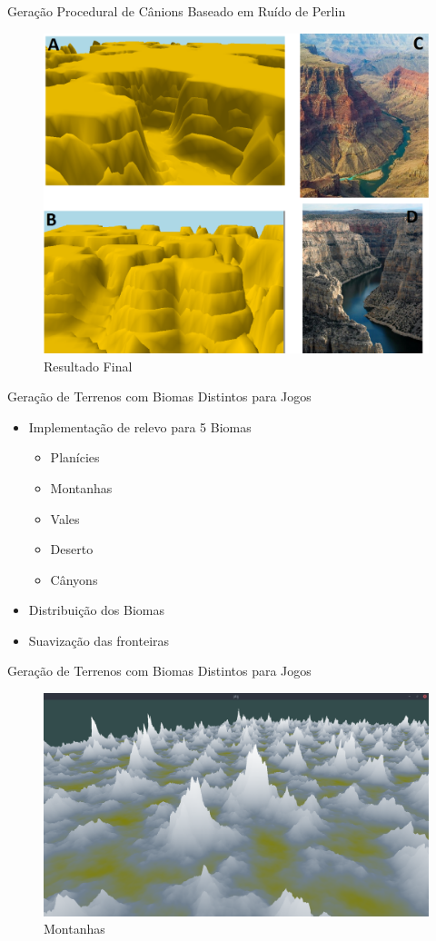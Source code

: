 \begin{frame}{Geração Procedural de Cânions Baseado em Ruído de Perlin}
  \begin{figure}
		\centering
        \includegraphics[width=.65\textwidth]{img/uffs/gabrielleResultado.png}
        \caption{Resultado Final}
  \end{figure}
\end{frame}


\begin{frame}{Geração de Terrenos com Biomas Distintos para Jogos}
    \begin{itemize}
        \item Implementação de relevo para 5 \alert{Biomas}
            \begin{itemize}
                \item Planícies
                \item Montanhas
                \item Vales
                \item Deserto
                \item Cânyons
            \end{itemize}
        \item Distribuição dos Biomas
        \item Suavização das fronteiras
    \end{itemize}
\end{frame}

\begin{frame}{Geração de Terrenos com Biomas Distintos para Jogos}
  \begin{figure}
		\centering
        \includegraphics[width=.8\textwidth]{img/uffs/bssMontains.png}
        \caption{Montanhas}
  \end{figure}
\end{frame}

